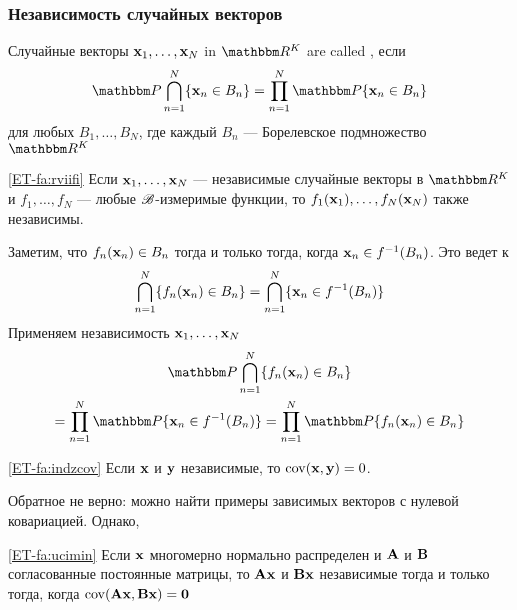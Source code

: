 \begin{frame}\frametitle{Независимость случайных векторов}

    \vspace{2em}
    Случайные векторы ${\mathbf x}_1, \ldots, {\mathbf x}_N$ in $\RR^K$ are called
    , если
    \begin{equation*}
        \label{eq:bcapv}
        \PP \bigcap_{n=1}^N \{\boldx_n \in B_n\}
        = \prod_{n=1}^N \PP\{\boldx_n \in B_n\} 
    \end{equation*}
    для любых $B_1, \ldots, B_N$, где каждый $B_n$ --- Борелевское подмножество $\RR^K$
    
\end{frame}

\begin{frame}
    
    \vspace{2em}
    \Fact\eqref{ET-fa:rviifi}
    Если ${\mathbf x}_1, \ldots, {\mathbf x}_N$ --- независимые случайные векторы в $\RR^K$ и 
    $f_1, \ldots, f_N$ --- любые $\mathscr B$-измеримые функции,
    то $f_1({\mathbf x}_1), \ldots, f_N({\mathbf x}_N)$ также независимы.
    
    \Prf 
    Заметим, что $f_n({\mathbf x}_n) \in B_n$ тогда и только тогда, когда ${\mathbf x}_n \in
    f^{-1}(B_n)$. Это ведет к
    \begin{equation*}
        \bigcap_{n=1}^N \{f_n({\mathbf x}_n) \in B_n\}
        = \bigcap_{n=1}^N \{{\mathbf x}_n \in f^{-1}(B_n)\}
    \end{equation*}
    Применяем независимость ${\mathbf x}_1, \ldots, {\mathbf x}_N$
    \begin{multline*}
        \PP
        \bigcap_{n=1}^N \{f_n(\boldx_n) \in B_n\}
        \\ = \prod_{n=1}^N \PP \{\boldx_n \in f^{-1}(B_n)\}
        = \prod_{n=1}^N \PP \{f_n(\boldx_n) \in B_n\}
    \end{multline*}
    
\end{frame}

\begin{frame}

    \vspace{2em}
    \Fact\eqref{ET-fa:indzcov}
    Если ${\mathbf x}$ и ${\mathbf y}$ независимые, то $\operatorname{cov}({\mathbf x},{\mathbf y}) = 0$.
        
    Обратное не верно: можно найти примеры зависимых векторов с нулевой ковариацией.  
    Однако,

    \Fact\eqref{ET-fa:ucimin}
    Если ${\mathbf x}$ многомерно нормально распределен и $\mathbf A$ и $\mathbf B$ 
    согласованные постоянные матрицы, то $\mathbf A {\mathbf x}$ и
    $\mathbf B {\mathbf x}$ независимые тогда и только тогда, когда $\operatorname{cov}(\mathbf A {\mathbf x}, \mathbf B{\mathbf x}) = {\mathbf 0}$
        
\end{frame}

